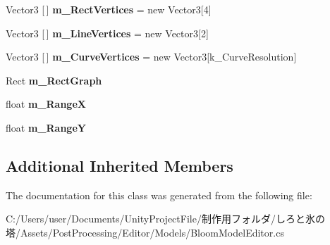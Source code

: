 \begin{DoxyCompactItemize}
Vector3 \mbox{[}$\,$\mbox{]} {\bfseries m\+\_\+\+Rect\+Vertices} = new Vector3\mbox{[}4\mbox{]}
\item 
\mbox{\label{class_unity_editor_1_1_post_processing_1_1_bloom_model_editor_ab39d78057e975eccdda23dcb39be5521}} 
Vector3 \mbox{[}$\,$\mbox{]} {\bfseries m\+\_\+\+Line\+Vertices} = new Vector3\mbox{[}2\mbox{]}
\item 
\mbox{\label{class_unity_editor_1_1_post_processing_1_1_bloom_model_editor_a9dd07b6cfe5861f5d5884b0703149506}} 
Vector3 \mbox{[}$\,$\mbox{]} {\bfseries m\+\_\+\+Curve\+Vertices} = new Vector3\mbox{[}k\+\_\+\+Curve\+Resolution\mbox{]}
\item 
\mbox{\label{class_unity_editor_1_1_post_processing_1_1_bloom_model_editor_a75783c68263576565b98281570c0308b}} 
Rect {\bfseries m\+\_\+\+Rect\+Graph}
\item 
\mbox{\label{class_unity_editor_1_1_post_processing_1_1_bloom_model_editor_a80fd54922c0811f647c1b4919909406e}} 
float {\bfseries m\+\_\+\+RangeX}
\item 
\mbox{\label{class_unity_editor_1_1_post_processing_1_1_bloom_model_editor_a69ee2e27acc06cac4a4f3aef00cc6d75}} 
float {\bfseries m\+\_\+\+RangeY}
\end{DoxyCompactItemize}
\subsection*{Additional Inherited Members}


The documentation for this class was generated from the following file\+:\begin{DoxyCompactItemize}
\item 
C\+:/\+Users/user/\+Documents/\+Unity\+Project\+File/制作用フォルダ/しろと氷の塔/\+Assets/\+Post\+Processing/\+Editor/\+Models/Bloom\+Model\+Editor.\+cs\end{DoxyCompactItemize}
